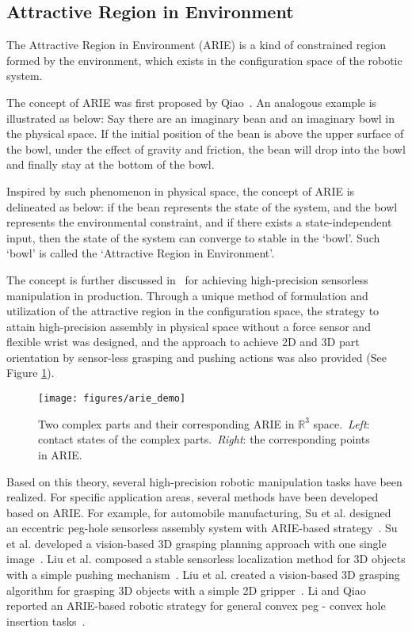 \documentclass[journal,twoside,web]{ieeecolor}
\begin{document}
\subsection{Attractive Region in Environment}
\label{subsec:arie}

The Attractive Region in Environment (ARIE) is a kind of constrained region formed by the environment, which exists in the configuration space of the robotic system.  

The concept of ARIE was first proposed by Qiao~\cite{Qiao2000}. An analogous example is illustrated as below: Say there are an imaginary bean and an imaginary bowl in the physical space. If the initial position of the bean is above the upper surface of the bowl, under the effect of gravity and friction, the bean will drop into the bowl and finally stay at the bottom of the bowl.

Inspired by such phenomenon in physical space, the concept of ARIE is delineated as below: 
if the bean represents the state of the system, and the bowl represents the environmental constraint, and if there exists a state-independent input, then the state of the system can converge to stable in the `bowl'. Such `bowl' is called the `Attractive Region in Environment'.

The concept is further discussed in~\cite{Qiao2002, Qiao2003} for achieving high-precision sensorless manipulation in production. Through a unique method of formulation and utilization of the attractive region in the configuration space, the strategy to attain high-precision assembly in physical space without a force sensor and flexible wrist was designed, and the approach to achieve 2D and 3D part orientation by sensor-less grasping and pushing actions was also provided (See Figure \ref{fig:arie}).



\begin{figure}[ht]
    \centering
    \texttt{[image: figures/arie\_demo]}
    \caption{Two complex parts and their corresponding ARIE in $\mathbb{R}^3$ space.~\textit{Left}: contact states of the complex parts.~\textit{Right}: the corresponding points in ARIE.}
    \label{fig:arie}
\end{figure}


Based on this theory, several high-precision robotic manipulation tasks have been realized. For specific application areas, several methods have been developed based on ARIE. 
For example, for automobile manufacturing, 
Su et al. designed an eccentric peg-hole sensorless assembly system with ARIE-based strategy~\cite{Su2012a, Su2012b}. 
Su et al. developed a vision-based 3D grasping planning approach with one single image~\cite{Su2009}. 
Liu et al. composed a stable sensorless localization method for 3D objects with a simple pushing mechanism~\cite{Liu2011}. 
Liu et al. created a vision-based 3D grasping algorithm for grasping 3D objects with a simple 2D gripper~\cite{Liu2014}.
Li and Qiao reported an ARIE-based robotic strategy for general convex peg - convex hole insertion tasks~\cite{Li2017}.
\end{document}
